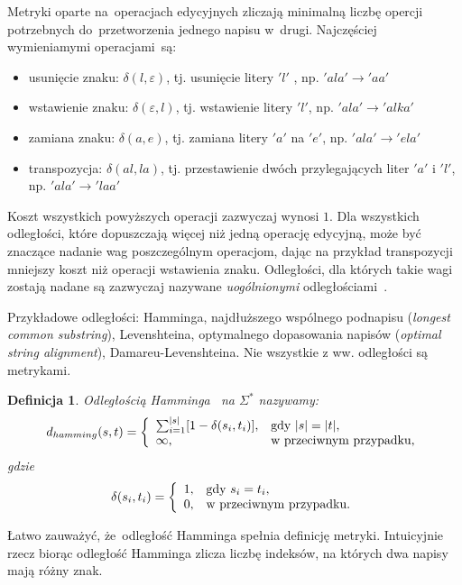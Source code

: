 \documentclass[12pt, twoside, openany]{report}
\theoremstyle{plain}
\newtheorem{defi}{Definicja}[section]
\begin{document}
Metryki oparte na~operacjach edycyjnych zliczają minimalną liczbę opercji potrzebnych do~przetworzenia jednego napisu w~drugi. Najczęściej wymieniamymi operacjami~są:
\begin{itemize}
\item usunięcie znaku: $\delta(l, \varepsilon)$, tj. usunięcie litery $'l'$ , np. $'ala' \rightarrow 'aa'$
\item wstawienie znaku: $\delta(\varepsilon, l)$, tj. wstawienie litery $'l'$, np. $'ala' \rightarrow 'alka'$
\item zamiana znaku: $\delta(a, e)$, tj. zamiana litery $'a'$ na $'e'$, np. $'ala' \rightarrow 'ela'$
\item transpozycja: $\delta(al, la)$, tj. przestawienie dwóch przylegających liter $'a'$ i $'l'$, np. $'ala' \rightarrow 'laa'$
\end{itemize}
Koszt wszystkich powyższych operacji zazwyczaj wynosi $1$. Dla wszystkich odległości, które dopuszczają więcej niż jedną operację edycyjną, może być znaczące nadanie wag poszczególnym operacjom, dając na przykład transpozycji mniejszy koszt niż operacji wstawienia znaku. Odległości, dla których takie wagi zostają nadane są zazwyczaj nazywane \emph{uogólnionymi} odległościami~\cite{Boytsov2011:indexingmethods}.

Przykładowe odległości: Hamminga, najdłuższego wspólnego podnapisu (\emph{longest common substring}), Levenshteina, optymalnego dopasowania napisów (\emph{optimal string alignment}), Damareu-Levenshteina. Nie wszystkie z ww. odległości są metrykami.

\begin{defi}
\emph{Odległością Hamminga}~\cite{Hamming1950:errordetecting} na $\Sigma^*$ nazywamy:
$$
d_{hamming}(s, t) = \left\{
\begin{array}{l l}     
    \sum_{i=1}^{|s|}[1 - \delta(s_i, t_i)], & \text{gdy } |s| = |t|,\\
    \infty, & \text{w przeciwnym przypadku},
\end{array}\right.
$$
gdzie 
$$
\delta(s_i, t_i) = \left\{
\begin{array}{l l}     
    1, & \text{gdy } s_i = t_i,\\
    0, & \text{w przeciwnym przypadku}.
\end{array}\right.
$$
\end{defi}

Łatwo zauważyć, że~odległość Hamminga spełnia definicję metryki. Intuicyjnie rzecz biorąc odległość Hamminga zlicza liczbę indeksów, na których dwa napisy mają różny znak.
\end{document}
